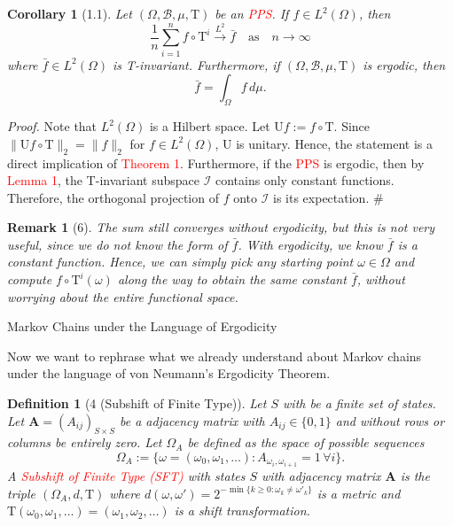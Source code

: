 \documentclass{article}
\newtheorem*{corollary}{Corollary}
\newtheorem*{definition}{Definition}
\newtheorem*{remark}{Remark}
\begin{document}
\begin{mdframed}[style=blueframe]
\begin{corollary}[1.1]
Let $(\Omega, \mathcal{B}, \mu, \mathrm{T})$ be an \textcolor{red}{PPS}. If $f \in L^2(\Omega)$, then
\[
\frac{1}{n}\sum_{i=1}^{n} f \circ \mathrm{T}^i \xrightarrow{L^2} \bar{f} \quad \text{as} \quad n \to \infty
\]
where $\bar{f} \in L^2(\Omega)$ is T-invariant. Furthermore, if $(\Omega, \mathcal{B}, \mu, \mathrm{T})$ is ergodic, then
\[
\bar{f} = \int_{\Omega} f \, d\mu.
\]
\end{corollary}
\end{mdframed}

\textit{Proof.} Note that $L^2(\Omega)$ is a Hilbert space. Let $\mathrm{U}f := f \circ \mathrm{T}$. Since $\|\mathrm{U}f \circ \mathrm{T}\|_2 = \|f\|_2$ for $f \in L^2(\Omega)$, U is unitary. Hence, the statement is a direct implication of \textcolor{red}{Theorem 1}. Furthermore, if the \textcolor{red}{PPS} is ergodic, then by \textcolor{red}{Lemma 1}, the T-invariant subspace $\mathcal{I}$ contains only constant functions. Therefore, the orthogonal projection of $f$ onto $\mathcal{I}$ is its expectation. \hfill $\#$

\begin{remark}[6]
The sum still converges without ergodicity, but \textit{this is not very useful}, since we do not know the form of $\bar{f}$. With ergodicity, we know $\bar{f}$ is a constant function. Hence, we can simply pick any starting point $\omega \in \Omega$ and compute $f \circ \mathrm{T}^i(\omega)$ along the way to obtain the same constant $\bar{f}$, without worrying about the entire functional space.
\end{remark}

{\quad Markov Chains under the Language of Ergodicity}

\vspace{0.5em}

Now we want to rephrase what we already understand about Markov chains under the language of von Neumann's Ergodicity Theorem.

\begin{mdframed}[style=redframe]
\begin{definition}[4 (Subshift of Finite Type)]
Let $S$ with be a \textit{finite set of states}. Let $\mathbf{A} = (A_{ij})_{S \times S}$ be a adjacency matrix with $A_{ij} \in \{0,1\}$ and without rows or columns be entirely zero. Let $\Omega_A$ be defined as the space of possible sequences
\[
\Omega_A := \{\omega = (\omega_0, \omega_1, \ldots) : A_{\omega_i, \omega_{i+1}} = 1 \,\forall i\}.
\]
A \textcolor{red}{Subshift of Finite Type (SFT)} with states $S$ with adjacency matrix $\mathbf{A}$ is the triple $(\Omega_A, d, \mathrm{T})$ where $d(\omega, \omega') = 2^{-\min\{k \geq 0 : \omega_k \neq \omega'_k\}}$ is a metric and $\mathrm{T}(\omega_0, \omega_1, \ldots) = (\omega_1, \omega_2, \ldots)$ is a shift transformation.
\end{definition}
\end{mdframed}
\end{document}
